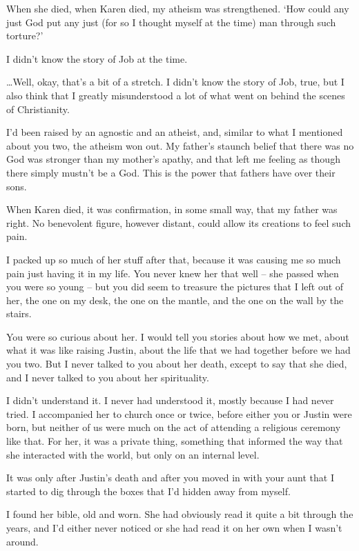 \begin{itshape}
When she died, when Karen died, my atheism was strengthened.  `How could any just God put any just (for so I thought myself at the time) man through such torture?'

I didn't know the story of Job at the time.

\ldots{}Well, okay, that's a bit of a stretch.  I didn't know the story of Job, true, but I also think that I greatly misunderstood a lot of what went on behind the scenes of Christianity.

I'd been raised by an agnostic and an atheist, and, similar to what I mentioned about you two, the atheism won out.  My father's staunch belief that there was no God was stronger than my mother's apathy, and that left me feeling as though there simply mustn't be a God.  This is the power that fathers have over their sons.

When Karen died, it was confirmation, in some small way, that my father was right.  No benevolent figure, however distant, could allow its creations to feel such pain.

I packed up so much of her stuff after that, because it was causing me so much pain just having it in my life.  You never knew her that well -- she passed when you were so young -- but you did seem to treasure the pictures that I left out of her, the one on my desk, the one on the mantle, and the one on the wall by the stairs.

You were so curious about her.  I would tell you stories about how we met, about what it was like raising Justin, about the life that we had together before we had you two.  But I never talked to you about her death, except to say that she died, and I never talked to you about her spirituality.

I didn't understand it.  I never had understood it, mostly because I had never tried.  I accompanied her to church once or twice, before either you or Justin were born, but neither of us were much on the act of attending a religious ceremony like that.  For her, it was a private thing, something that informed the way that she interacted with the world, but only on an internal level.

It was only after Justin's death and after you moved in with your aunt that I started to dig through the boxes that I'd hidden away from myself.

I found her bible, old and worn.  She had obviously read it quite a bit through the years, and I'd either never noticed or she had read it on her own when I wasn't around.


\end{itshape}
